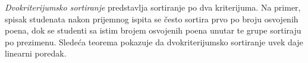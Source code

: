 

\emph{Dvokriterijumsko sortiranje} predstavlja sortiranje po dva kriterijuma. Na primer,
spisak studenata nakon prijemnog ispita se \v cesto sortira
prvo po broju osvojenih poena, dok se studenti sa istim brojem osvojenih poena unutar te grupe
sortiraju po prezimenu. Slede\'ca teorema pokazuje da dvokriterijumsko sortiranje uvek daje linearni poredak.

